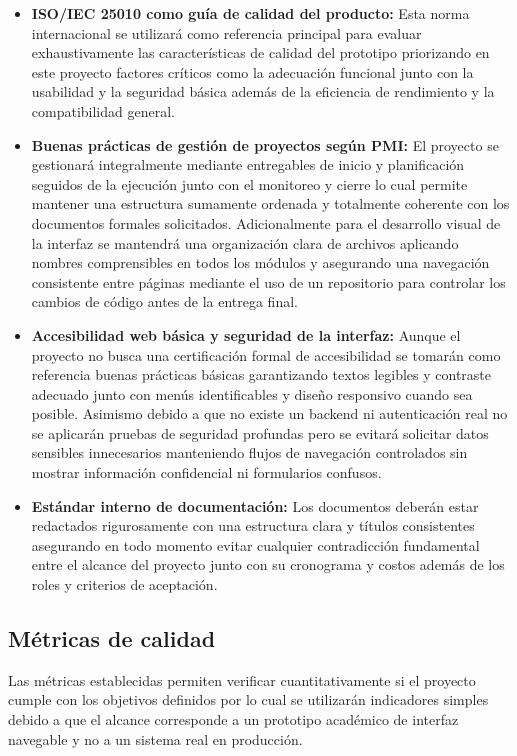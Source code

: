 \documentclass[11pt,spanish]{article}
\begin{document}
\begin{itemize}
    \item \textbf{ISO/IEC 25010 como guía de calidad del producto:} Esta norma internacional se utilizará como referencia principal para evaluar exhaustivamente las características de calidad del prototipo priorizando en este proyecto factores críticos como la adecuación funcional junto con la usabilidad y la seguridad básica además de la eficiencia de rendimiento y la compatibilidad general.
    \item \textbf{Buenas prácticas de gestión de proyectos según PMI:} El proyecto se gestionará integralmente mediante entregables de inicio y planificación seguidos de la ejecución junto con el monitoreo y cierre lo cual permite mantener una estructura sumamente ordenada y totalmente coherente con los documentos formales solicitados. Adicionalmente para el desarrollo visual de la interfaz se mantendrá una organización clara de archivos aplicando nombres comprensibles en todos los módulos y asegurando una navegación consistente entre páginas mediante el uso de un repositorio para controlar los cambios de código antes de la entrega final.
    \item \textbf{Accesibilidad web básica y seguridad de la interfaz:} Aunque el proyecto no busca una certificación formal de accesibilidad se tomarán como referencia buenas prácticas básicas garantizando textos legibles y contraste adecuado junto con menús identificables y diseño responsivo cuando sea posible. Asimismo debido a que no existe un backend ni autenticación real no se aplicarán pruebas de seguridad profundas pero se evitará solicitar datos sensibles innecesarios manteniendo flujos de navegación controlados sin mostrar información confidencial ni formularios confusos.
    \item \textbf{Estándar interno de documentación:} Los documentos deberán estar redactados rigurosamente con una estructura clara y títulos consistentes asegurando en todo momento evitar cualquier contradicción fundamental entre el alcance del proyecto junto con su cronograma y costos además de los roles y criterios de aceptación.
\end{itemize}

\subsection{Métricas de calidad}

Las métricas establecidas permiten verificar cuantitativamente si el proyecto cumple con los objetivos definidos por lo cual se utilizarán indicadores simples debido a que el alcance corresponde a un prototipo académico de interfaz navegable y no a un sistema real en producción.
\end{document}
